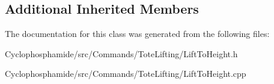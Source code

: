 \subsection*{Additional Inherited Members}


The documentation for this class was generated from the following files\+:\begin{DoxyCompactItemize}
\item 
Cyclophosphamide/src/\+Commands/\+Tote\+Lifting/Lift\+To\+Height.\+h\item 
Cyclophosphamide/src/\+Commands/\+Tote\+Lifting/Lift\+To\+Height.\+cpp\end{DoxyCompactItemize}
